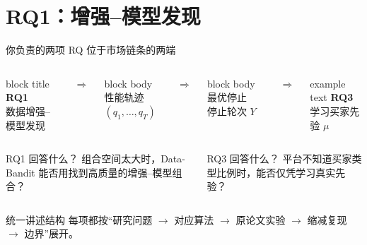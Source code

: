 
\providecommand{\slideref}[1]{\textcolor{black!60}{\small [#1]}}

\section{RQ1：增强--模型发现}

\begin{frame}{你负责的两项 RQ 位于市场链条的两端}
\begin{columns}[c,onlytextwidth]
\begin{beamercolorbox}[wd=\linewidth,ht=1.05cm,dp=0.15cm,center,rounded=true]{block title}
\textbf{RQ1}\\数据增强--模型发现
\end{beamercolorbox}
\centering$\Rightarrow$
\begin{beamercolorbox}[wd=\linewidth,ht=1.05cm,dp=0.15cm,center,rounded=true]{block body}
性能轨迹\\$(q_1,\ldots,q_T)$
\end{beamercolorbox}
\centering$\Rightarrow$
\begin{beamercolorbox}[wd=\linewidth,ht=1.05cm,dp=0.15cm,center,rounded=true]{block body}
最优停止\\停止轮次 $Y$
\end{beamercolorbox}
\centering$\Rightarrow$
\begin{beamercolorbox}[wd=\linewidth,ht=1.05cm,dp=0.15cm,center,rounded=true]{example text}
\textbf{RQ3}\\学习买家先验 $\mu$
\end{beamercolorbox}
\end{columns}
\vspace{0.7em}
\begin{columns}[T,onlytextwidth]
\begin{block}{RQ1 回答什么？}
组合空间太大时，Data-Bandit 能否用找到高质量的增强--模型组合？
\end{block}
\begin{block}{RQ3 回答什么？}
平台不知道买家类型比例时，能否仅凭学习真实先验？
\end{block}
\end{columns}
\begin{alertblock}{统一讲述结构}
每项都按“研究问题 $\rightarrow$ 对应算法 $\rightarrow$ 原论文实验 $\rightarrow$ 缩减复现 $\rightarrow$ 边界”展开。
\end{alertblock}
\end{frame}

